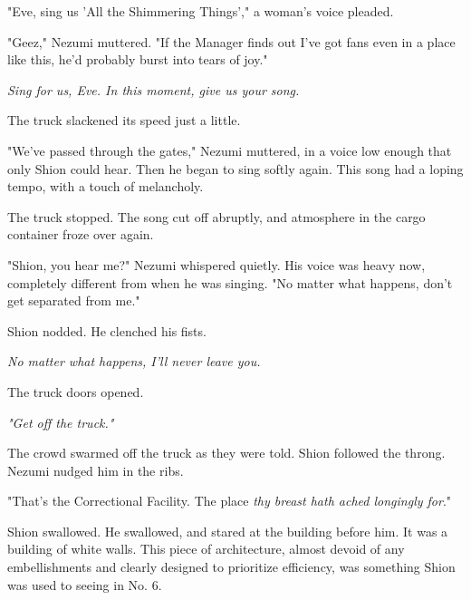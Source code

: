 "Eve, sing us 'All the Shimmering Things'," a woman's voice pleaded.

"Geez," Nezumi muttered. "If the Manager finds out I've got fans even in
a place like this, he'd probably burst into tears of joy."

\emph{Sing for us, Eve. In this moment, give us your song.}

The truck slackened its speed just a little.

"We've passed through the gates," Nezumi muttered, in a voice low enough
that only Shion could hear. Then he began to sing softly again. This
song had a loping tempo, with a touch of melancholy.


The truck stopped. The song cut off abruptly, and atmosphere in the
cargo container froze over again.

"Shion, you hear me?" Nezumi whispered quietly. His voice was heavy now,
completely different from when he was singing. "No matter what happens,
don't get separated from me."

Shion nodded. He clenched his fists.

\emph{No matter what happens, I'll never leave you.}

The truck doors opened.

\emph{"Get off the truck."}

The crowd swarmed off the truck as they were told. Shion followed the
throng. Nezumi nudged him in the ribs.

"That's the Correctional Facility. The place \emph{thy breast hath ached
longingly for}."

Shion swallowed. He swallowed, and stared at the building before him. It
was a building of white walls. This piece of architecture, almost devoid
of any embellishments and clearly designed to prioritize efficiency, was
something Shion was used to seeing in No. 6.

